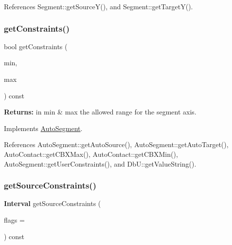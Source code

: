 References Segment\+::get\+Source\+Y(), and Segment\+::get\+Target\+Y().

\mbox{\label{classKatabatic_1_1AutoVertical_a16737e7f2b77f8595fd2b607fac0f2f5}} 
\subsubsection{\texorpdfstring{get\+Constraints()}{getConstraints()}}
{\footnotesize\ttfamily bool get\+Constraints (\begin{DoxyParamCaption}\item[{\textbf{ Db\+U\+::\+Unit} \&}]{min,  }\item[{\textbf{ Db\+U\+::\+Unit} \&}]{max }\end{DoxyParamCaption}) const\hspace{0.3cm}{\ttfamily [virtual]}}

{\bfseries Returns\+:} in {\ttfamily min} \& {\ttfamily max} the allowed range for the segment axis. 

Implements \hyperlink{classKatabatic_1_1AutoSegment_a7c2fed22b081f8d3b7a69abb457153ea}{Auto\+Segment}.



References Auto\+Segment\+::get\+Auto\+Source(), Auto\+Segment\+::get\+Auto\+Target(), Auto\+Contact\+::get\+C\+B\+X\+Max(), Auto\+Contact\+::get\+C\+B\+X\+Min(), Auto\+Segment\+::get\+User\+Constraints(), and Db\+U\+::get\+Value\+String().

\mbox{\label{classKatabatic_1_1AutoVertical_a3239751f475bc65adb9d56f6c771ebb0}} 
\subsubsection{\texorpdfstring{get\+Source\+Constraints()}{getSourceConstraints()}}
{\footnotesize\ttfamily \textbf{ Interval} get\+Source\+Constraints (\begin{DoxyParamCaption}\item[{unsigned int}]{flags = {} }\end{DoxyParamCaption}) const\hspace{0.3cm}{\ttfamily [virtual]}}

